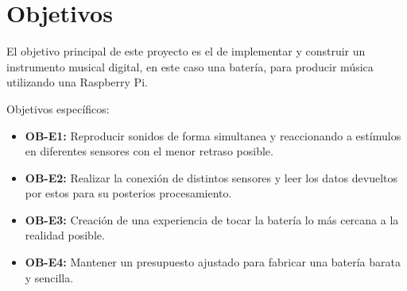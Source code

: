 
\chapter{Objetivos} %
\label{cha:Objetivos}

    El objetivo principal de este proyecto es el de implementar y construir un instrumento musical digital, en este caso
    una batería, para producir música utilizando una Raspberry Pi.

    Objetivos específicos:
    \begin{itemize}
        \item \textbf{OB-E1:} Reproducir sonidos de forma simultanea y reaccionando a estímulos en diferentes sensores
        con el menor retraso posible.
        \item \textbf{OB-E2:} Realizar la conexión de distintos sensores y leer los datos devueltos por estos para su
        posterios procesamiento.
        \item \textbf{OB-E3:} Creación de una experiencia de tocar la batería lo más cercana a la realidad posible.
        \item \textbf{OB-E4:} Mantener un presupuesto ajustado para fabricar una batería barata y sencilla.
    \end{itemize}

